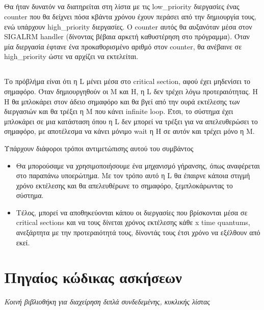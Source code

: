 \documentclass[a4paper,10pt]{article} \usepackage{anysize}
\begin{document}
\subsection{}
Θα ήταν δυνατόν να διατηρείται στη λίστα με τις low\_priority διεργασίες ένας
counter που θα δείχνει πόσα κβάντα χρόνου έχουν περάσει από την δημιουργία
τους, ενώ υπάρχουν high\_priority διεργασίες. Ο counter αυτός θα αυξανόταν μέσα
στον SIGALRM handler (δίνοντας βέβαια αρκετή καθυστέρηση στο πρόγραμμα). Όταν
μία διεργασία έφτανε ένα προκαθορισμένο αριθμό στον counter, θα ανέβαινε σε
high\_priority ώστε να αρχίζει να εκτελείται.
\subsection{}
Το πρόβλήμα είναι ότι η L μένει μέσα στο critical section, αφού έχει μηδενίσει
το σημαφόρο. Όταν δημιουργηθούν οι Μ και H, η L δεν τρέχει λόγω
προτεραιότητας. Η H θα μπλοκάρει στον άδειο σημαφόρο και θα βγεί από την ουρά
εκτέλεσης των διεργασιών και θα τρέξει η M που κάνει infinite loop. Έτσι, το
σύστημα έχει μπλοκάρει σε μια κατάσταση όπου η L δεν μπορεί να τρέξει για να
απελευθερώσει το σημαφόρο, με αποτέλεσμα να κάνει μόνιμο wait η H σε αυτόν και
τρέχει μόνο η M.

Υπάρχουν διάφοροι τρόποι αντιμετώπισης αυτού του συμβάντος
\begin{itemize}
\item Θα μπορούσαμε να χρησιμοποιήσουμε ένα μηχανισμό γήρανσης, όπως
αναφέρεται στο παραπάνω υποερώτημα. Με τον τρόπο αυτό η L θα έπαιρνε κάποια
στιγμή χρόνο εκτέλεσης και θα απελευθέρωνε το σημαφόρο, ξεμπλοκάρωντας το
σύστημα.
\item Τέλος, μπορεί να αποθηκεύονται κάπου οι διεργασίες που βρίσκονται μέσα
σε critical sections και να τους δίνεται χρόνος εκτέλεσης κάθε x time
quantums, ανεξάρτητα με την προτεραιότητά τους, δίνοντάς τους έτσι χρόνο να
εξέλθουν από εκεί.

\end{itemize}

\vspace{1cm}
\def\thesubsection {Άσκηση \arabic{section}.\arabic{subsection}}
\section*{Πηγαίος κώδικας ασκήσεων}
\emph{Κοινή βιβλιοθήκη για διαχείρηση διπλά συνδεδεμένης, κυκλικής λίστας}
\inputminted[linenos,fontsize=\footnotesize,frame=leftline]{c}{files/queue.h}
\inputminted[linenos,fontsize=\footnotesize,frame=leftline]{c}{files/queue.c}
\setcounter{section}{1}
\setcounter{subsection}{0}
\end{document}
